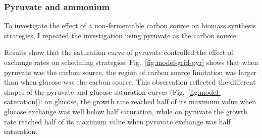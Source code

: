 \subsubsection{Pyruvate and ammonium}
\label{subsec:model-grid-pyruvate}

To investigate the effect of a non-fermentable carbon source on biomass synthesis strategies, I repeated the investigation using pyruvate as the carbon source. %

Results show that the saturation curve of pyruvate controlled the effect of exchange rates on scheduling strategies.
Fig.\ \ref{fig:model-grid-pyr} shows that when pyruvate was the carbon source, the region of carbon source limitation was larger than when glucose was the carbon source.
This observation reflected the different shapes of the pyruvate and glucose saturation curves (Fig.\ \ref{fig:model-saturation}): on glucose, the growth rate reached half of its maximum value when glucose exchange was well below half saturation, while on pyruvate the growth rate reached half of its maximum value when pyruvate exchange was half saturation.

